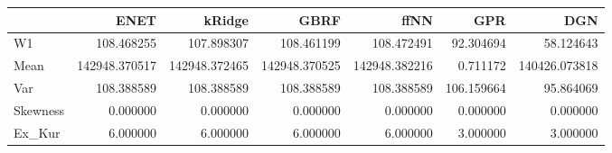 \begin{tabular}{lrrrrrr}
\toprule
{} &           ENET &         kRidge &           GBRF &           ffNN &         GPR &            DGN \\
\midrule
W1       &     108.468255 &     107.898307 &     108.461199 &     108.472491 &   92.304694 &      58.124643 \\
Mean     &  142948.370517 &  142948.372465 &  142948.370525 &  142948.382216 &    0.711172 &  140426.073818 \\
Var      &     108.388589 &     108.388589 &     108.388589 &     108.388589 &  106.159664 &      95.864069 \\
Skewness &       0.000000 &       0.000000 &       0.000000 &       0.000000 &    0.000000 &       0.000000 \\
Ex\_Kur   &       6.000000 &       6.000000 &       6.000000 &       6.000000 &    3.000000 &       3.000000 \\
\bottomrule
\end{tabular}
